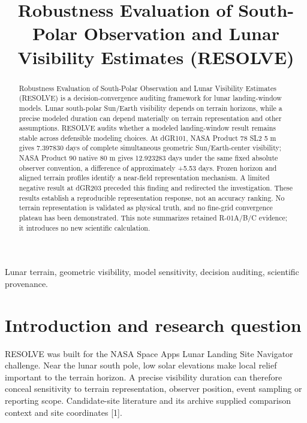 \documentclass[conference,letterpaper]{IEEEtran}
\begin{document}
\title{Robustness Evaluation of South-Polar Observation and Lunar Visibility Estimates (RESOLVE)}
\author{}
\maketitle

\begin{abstract}

Robustness Evaluation of South-Polar Observation and Lunar Visibility Estimates (RESOLVE) is a decision-convergence auditing framework for lunar landing-window models. Lunar south-polar Sun/Earth visibility depends on terrain horizons, while a precise modeled duration can depend materially on terrain representation and other assumptions. RESOLVE audits whether a modeled landing-window result remains stable across defensible modeling choices. At dGR101, NASA Product 78 SL2 5 m gives 7.397830 days of complete simultaneous geometric Sun/Earth-center visibility; NASA Product 90 native 80 m gives 12.923283 days under the same fixed absolute observer convention, a difference of approximately +5.53 days. Frozen horizon and aligned terrain profiles identify a near-field representation mechanism. A limited negative result at dGR203 preceded this finding and redirected the investigation. These results establish a reproducible representation response, not an accuracy ranking. No terrain representation is validated as physical truth, and no fine-grid convergence plateau has been demonstrated. This note summarizes retained R-01A/B/C evidence; it introduces no new scientific calculation.

\end{abstract}

\begin{IEEEkeywords}Lunar terrain, geometric visibility, model sensitivity, decision auditing, scientific provenance.\end{IEEEkeywords}

\section{Introduction and research question}

RESOLVE was built for the NASA Space Apps Lunar Landing Site Navigator challenge. Near the lunar south pole, low solar elevations make local relief important to the terrain horizon. A precise visibility duration can therefore conceal sensitivity to terrain representation, observer position, event sampling or reporting scope. Candidate-site literature and its archive supplied comparison context and site coordinates [1].
\end{document}
